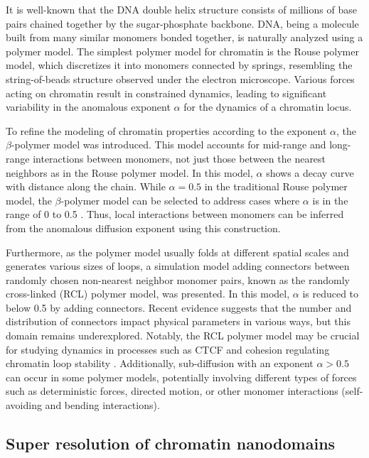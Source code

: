 It is well-known that the DNA double helix structure consists of millions of base pairs chained together by the sugar-phosphate backbone. DNA, being a molecule built from many similar monomers bonded together, is naturally analyzed using a polymer model. The simplest polymer model for chromatin is the Rouse polymer model, which discretizes it into monomers connected by springs, resembling the string-of-beads structure observed under the electron microscope. Various forces acting on chromatin result in constrained dynamics, leading to significant variability in the anomalous exponent $\alpha$ for the dynamics of a chromatin locus.

To refine the modeling of chromatin properties according to the exponent $\alpha$, the $\beta$-polymer model was introduced. This model accounts for mid-range and long-range interactions between monomers, not just those between the nearest neighbors as in the Rouse polymer model. In this model, $\alpha$ shows a decay curve with distance along the chain. While $\alpha = 0.5$ in the traditional Rouse polymer model, the $\beta$-polymer model can be selected to address cases where $\alpha$ is in the range of 0 to 0.5 \parencite{Amitai2013,Amitai2017,Hajjoul2013}. Thus, local interactions between monomers can be inferred from the anomalous diffusion exponent using this construction.

Furthermore, as the polymer model usually folds at different spatial scales and generates various sizes of loops, a simulation model adding connectors between randomly chosen non-nearest neighbor monomer pairs, known as the randomly cross-linked (RCL) polymer model, was presented. In this model, $\alpha$ is reduced to below 0.5 by adding connectors. Recent evidence suggests that the number and distribution of connectors impact physical parameters in various ways, but this domain remains underexplored. Notably, the RCL polymer model may be crucial for studying dynamics in processes such as CTCF and cohesion regulating chromatin loop stability \parencite{Hansen2017}. Additionally, sub-diffusion with an exponent $\alpha > 0.5$ can occur in some polymer models, potentially involving different types of forces such as deterministic forces, directed motion, or other monomer interactions (self-avoiding and bending interactions).

\subsection{Super resolution of chromatin nanodomains}

